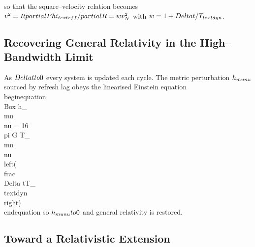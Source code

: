 \documentclass[twocolumn,prd,amsmath,amssymb,aps,superscriptaddress,nofootinbib]{revtex4-2}
\begin{document}
so that the square--velocity relation becomes $v^2 = R \\partial\\Phi_{\\text{eff}}/\\partial R = w v_N^2$ with $w = 1 + \\Delta t/T_{\\text{dyn}}$.

\subsection{Recovering General Relativity in the High--Bandwidth Limit}

As $\\Delta t \\to 0$ every system is updated each cycle. The metric perturbation $h_{\\mu\\nu}$ sourced by refresh lag obeys the linearised Einstein equation
\\begin{equation}
\\Box h_{\\mu\\nu} = 16\\pi G T_{\\mu\\nu} \\left(\\frac{\\Delta t}{T_{\\text{dyn}}}\\right)
\\end{equation}
so $h_{\\mu\\nu} \\to 0$ and general relativity is restored.

\subsection{Toward a Relativistic Extension}
\end{document}
